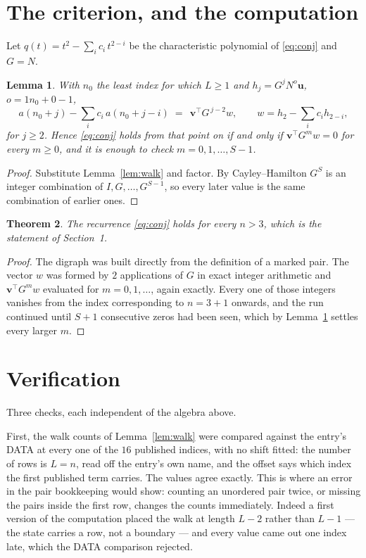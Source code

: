 \documentclass[11pt,a4paper]{article}
\theoremstyle{plain}
\newtheorem{theorem}{Theorem}
\newtheorem{lemma}[theorem]{Lemma}
\theoremstyle{definition}
\begin{document}
\section{The criterion, and the computation}

Let $q(t)=t^{2}-\sum_i c_i\,t^{2-i}$ be the characteristic polynomial of
\eqref{eq:conj} and $G=N$.

\begin{lemma}\label{lem:crit}
With $n_0$ the least index for which $L\ge1$ and $h_j=G^{j}N^{o}\mathbf{u}$,
$o=1n_0+0-1$,
\[
a(n_0+j)-\sum_i c_i\,a(n_0+j-i)\;=\;\,\mathbf{v}^{\!\top}G^{\,j-2}w,
\qquad w=h_{2}-\sum_i c_i h_{2-i},
\]
for $j\ge2$. Hence \eqref{eq:conj} holds from that point on if and only if
$\mathbf{v}^{\!\top}G^{m}w=0$ for every $m\ge0$, and it is enough to check
$m=0,1,\dots,S-1$.
\end{lemma}

\begin{proof}
Substitute Lemma~\ref{lem:walk} and factor. By Cayley--Hamilton $G^{S}$ is an integer
combination of $I,G,\dots,G^{S-1}$, so every later value is the same combination of earlier
ones.
\end{proof}

\begin{theorem}
The recurrence \eqref{eq:conj} holds for every $n>3$, which is the statement of
Section~1.
\end{theorem}

\begin{proof}
The digraph was built directly from the definition of a marked pair. The vector $w$ was
formed by $2$ applications of $G$ in exact integer arithmetic and
$\mathbf{v}^{\!\top}G^{m}w$ evaluated for $m=0,1,\dots$, again exactly. Every one of
those integers vanishes from the index corresponding to $n=3+1$ onwards, and the run
continued until $S+1$ consecutive zeros had been seen, which by Lemma~\ref{lem:crit}
settles every larger $m$.
\end{proof}

\section{Verification}

Three checks, each independent of the algebra above.

First, the walk counts of Lemma~\ref{lem:walk} were compared against the entry's DATA at
every one of the $16$ published indices, with no shift fitted: the number of rows is
$L=n$, read off the entry's own name, and the offset says which index the first
published term carries. The values agree exactly. This is where an error in the pair
bookkeeping would show: counting an unordered pair twice, or missing the pairs inside the
first row, changes the counts immediately. Indeed a first version of the computation
placed the walk at length $L-2$ rather than $L-1$ --- the state carries a row, not a
boundary --- and every value came out one index late, which the DATA comparison rejected.
\end{document}
